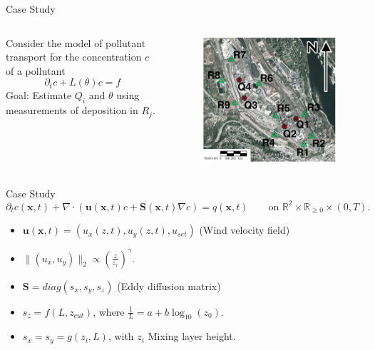 \documentclass[11pt]{beamer}
\theoremstyle{plain}
\theoremstyle{definition}
\newcommand\ChangeFont{\fontsize{9}{7.2}\selectfont}
\begin{document}
\begin{frame}{Case Study}

\begin{columns}[c]
\column{1.5in}
Consider the model of pollutant transport for the concentration $c$ of a pollutant
\begin{equation*}
\partial_{t} c+L(\theta)c=f
\end{equation*}
Goal: Estimate $Q_{i}$ and $\theta$ using measurements of deposition in  $R_{j}$.
\column{1.5in}
\begin{figure}
\includegraphics[scale=0.36]{BCtrail}
\ChangeFont
\end{figure}

\end{columns}
\end{frame}




\begin{frame}{Case Study}
\begin{equation*}
\partial_{t} c(\textbf{x},t)+\nabla\cdot(\textbf{u}(\textbf{x},t)c+\textbf{S}(\textbf{x},t)\nabla c)
=q(\textbf{x},t)\qquad\text{on }\mathbb{R}^{2}\times\mathbb{R}_{\geq 0}\times(0,T).
\end{equation*}
\begin{itemize}
\item $\textbf{u}(\textbf{x},t)=(u_{x}(z,t),u_{y}(z,t),u_{set})$ 
(Wind velocity field)
\item $\|(u_{x},u_{y})\|_{2}\propto\left(\frac{z}{z_{r}}\right)^{\gamma}$.
\item $\textbf{S}=diag(s_{x},s_{y},s_{z})$ (Eddy diffusion matrix)
\item $s_{z}=f(L,z_{cut})$, where $\frac{1}{L}=a+b\log_{10}(z_{0})$.
\item $s_{x}=s_{y}=g(z_{i},L)$, with $z_{i}$ Mixing layer height.
\end{itemize}
\end{frame}
\end{document}
